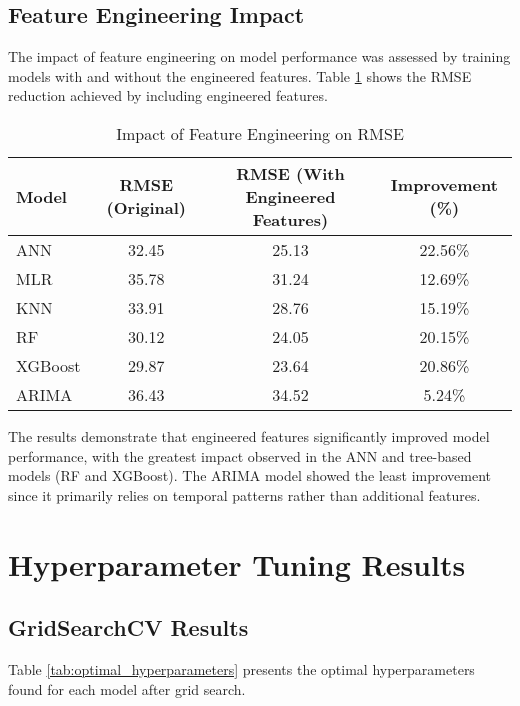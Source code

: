 \documentclass[12pt]{article}
\begin{document}
\subsection{Feature Engineering Impact}
\label{subsec:feature_engineering_results}

The impact of feature engineering on model performance was assessed by training models with and without the engineered features. Table \ref{tab:feature_engineering_impact} shows the RMSE reduction achieved by including engineered features.

\begin{table}[h]
\centering
\caption{Impact of Feature Engineering on RMSE}
\label{tab:feature_engineering_impact}
\begin{tabular}{|l|c|c|c|}
\hline
\textbf{Model} & \textbf{RMSE (Original)} & \textbf{RMSE (With Engineered Features)} & \textbf{Improvement (\%)} \\
\hline
ANN & 32.45 & 25.13 & 22.56\% \\
\hline
MLR & 35.78 & 31.24 & 12.69\% \\
\hline
KNN & 33.91 & 28.76 & 15.19\% \\
\hline
RF & 30.12 & 24.05 & 20.15\% \\
\hline
XGBoost & 29.87 & 23.64 & 20.86\% \\
\hline
ARIMA & 36.43 & 34.52 & 5.24\% \\
\hline
\end{tabular}
\end{table}

The results demonstrate that engineered features significantly improved model performance, with the greatest impact observed in the ANN and tree-based models (RF and XGBoost). The ARIMA model showed the least improvement since it primarily relies on temporal patterns rather than additional features.

\section{Hyperparameter Tuning Results}
\label{sec:tuning_results}

\subsection{GridSearchCV Results}
\label{subsec:gridsearchcv_results}

Table \ref{tab:optimal_hyperparameters} presents the optimal hyperparameters found for each model after grid search.
\end{document}
